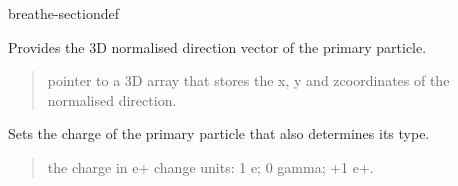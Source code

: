 \documentclass[letterpaper,10pt,english]{sphinxmanual}
\begin{document}
\begin{fulllineitems}
\begin{sphinxuseclass}{breathe-sectiondef}
\begin{fulllineitems}
\label{\detokenize{Simulation/SimulationCodeDoc:_CPPv4NK16PrimaryGenerator12GetDirectionEv}}
\pysigstartsignatures
\pysigstartmultiline
{}
\pysigstopmultiline
\pysigstopsignatures
\sphinxAtStartPar
Provides the 3D normalised direction vector of the primary particle. 

\sphinxAtStartPar
\begin{quote}\begin{description}
\sphinxAtStartPar
pointer to a 3D array that stores the x, y and z\sphinxhyphen{}coordinates of the normalised direction. 

\end{description}\end{quote}


\end{fulllineitems}


\begin{fulllineitems}
\label{\detokenize{Simulation/SimulationCodeDoc:_CPPv4N16PrimaryGenerator9SetChargeEd}}
\pysigstartsignatures
\pysigstartmultiline
{}
\pysigstopmultiline
\pysigstopsignatures
\sphinxAtStartPar
Sets the charge of the primary particle that also determines its type. 

\sphinxAtStartPar
\begin{quote}\begin{description}
\sphinxAtStartPar
\sphinxstylestrong{{[}in{]}} the charge in e+ change units: \sphinxhyphen{}1 e\sphinxhyphen{}; 0 gamma; +1 e+. 

\end{description}\end{quote}



\end{fulllineitems}
\end{sphinxuseclass}
\end{fulllineitems}
\end{document}

